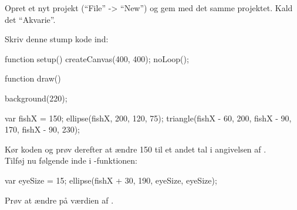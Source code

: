 \documentclass{ucph-handout}
\newcounter{handout}
\newcommand{\Ark}{Ark \#\arabic{handout} -- }
\begin{document}
\newpage
{}
\renewcommand{\Title}{\Ark Variable}%
\begin{exercisebox}[adjusted title=Tegn en simpel fisk]
Opret et nyt projekt (``File'' -> ``New'') og gem med det samme
projektet. Kald det ``Akvarie''.

\noindent
Skriv denne stump kode ind:
\begin{javascript}
function setup() {
  createCanvas(400, 400);
  noLoop();
}

function draw() {
  background(220);
  
  var fishX = 150;
  ellipse(fishX, 200, 120, 75);
  triangle(fishX - 60, 200, fishX - 90, 170, fishX - 90, 230);
}

\end{javascript}
Kør koden og prøv derefter at ændre 150 til et andet tal i angivelsen af .\\

\noindent
Tilføj nu følgende inde i -funktionen:
\begin{javascript}
var eyeSize = 15;
ellipse(fishX + 30, 190, eyeSize, eyeSize);
\end{javascript}
Prøv at ændre på værdien af .
\end{exercisebox}
\end{document}
